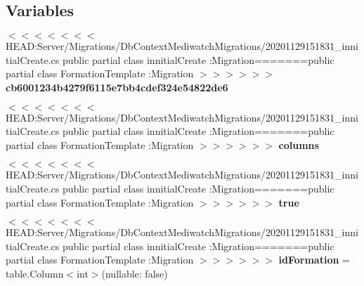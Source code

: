 \subsection*{Variables}
\begin{DoxyCompactItemize}
\item 
\mbox{\label{namespace_mediwatch_1_1_server_1_1_migrations_1_1_db_context_mediwatch_migrations_a142fa3f5e05f1480e2d6a9bcf05c0d83}} 
$<$$<$$<$$<$$<$$<$$<$ H\+E\+A\+D\+:\+Server/Migrations/Db\+Context\+Mediwatch\+Migrations/20201129151831\+\_\+innitial\+Create.\+cs public partial class innitial\+Create \+:\+Migration=======public partial class Formation\+Template \+:\+Migration $>$$>$$>$$>$$>$$>$ {\bfseries cb6001234b4279f6115e7bb4cdef324e54822de6}
\item 
\mbox{\label{namespace_mediwatch_1_1_server_1_1_migrations_1_1_db_context_mediwatch_migrations_a5ae5d5046c61950e17baa84c44dcedba}} 
$<$$<$$<$$<$$<$$<$$<$ H\+E\+A\+D\+:\+Server/Migrations/Db\+Context\+Mediwatch\+Migrations/20201129151831\+\_\+innitial\+Create.\+cs public partial class innitial\+Create \+:\+Migration=======public partial class Formation\+Template \+:\+Migration $>$$>$$>$$>$$>$$>$ {\bfseries columns}
\item 
\mbox{\label{namespace_mediwatch_1_1_server_1_1_migrations_1_1_db_context_mediwatch_migrations_a43518a4f5ff1f024df19f67d6a2aec18}} 
$<$$<$$<$$<$$<$$<$$<$ H\+E\+A\+D\+:\+Server/Migrations/Db\+Context\+Mediwatch\+Migrations/20201129151831\+\_\+innitial\+Create.\+cs public partial class innitial\+Create \+:\+Migration=======public partial class Formation\+Template \+:\+Migration $>$$>$$>$$>$$>$$>$ {\bfseries true}
\item 
\mbox{\label{namespace_mediwatch_1_1_server_1_1_migrations_1_1_db_context_mediwatch_migrations_ae9b3b30abeb45f7fd34f4757445c5908}} 
$<$$<$$<$$<$$<$$<$$<$ H\+E\+A\+D\+:\+Server/Migrations/Db\+Context\+Mediwatch\+Migrations/20201129151831\+\_\+innitial\+Create.\+cs public partial class innitial\+Create \+:\+Migration=======public partial class Formation\+Template \+:\+Migration $>$$>$$>$$>$$>$$>$ {\bfseries id\+Formation} = table.\+Column$<$int$>$(nullable\+: false)

\end{DoxyCompactItemize}
